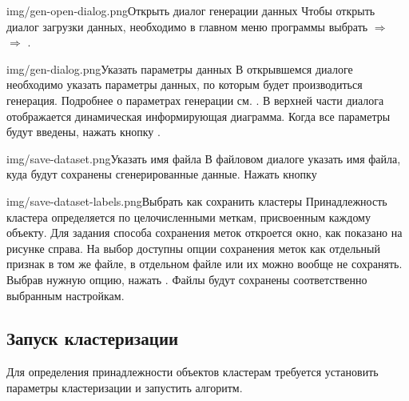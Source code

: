 \documentclass[12pt,tikz]{instruction}
\begin{document}
\begin{steps}
	\begin{ist}{img/gen-open-dialog.png}{Открыть диалог генерации данных}
		Чтобы открыть диалог загрузки данных, необходимо в главном меню программы выбрать  $\Rightarrow$  $\Rightarrow$ .
	\end{ist}
	\begin{ist}{img/gen-dialog.png}{Указать параметры данных}
		В открывшемся диалоге необходимо указать параметры данных, по которым будет производиться генерация. Подробнее о параметрах генерации см. \cite{kovaleva}. В верхней части диалога отображается динамическая информирующая диаграмма. Когда все параметры будут введены, нажать кнопку . \vspace{1.2cm}
	\end{ist}
	\begin{ist}{img/save-dataset.png}{Указать имя файла}
		В файловом диалоге указать имя файла, куда будут сохранены сгенерированные данные. Нажать кнопку  
	\end{ist}
	\begin{ist}{img/save-dataset-labels.png}{Выбрать как сохранить кластеры}
		Принадлежность кластера определяется по целочисленными меткам, присвоенным каждому объекту. Для задания способа сохранения меток откроется окно, как показано на рисунке справа. На выбор доступны опции сохранения меток как отдельный признак в том же файле, в отдельном файле или их можно вообще не сохранять. Выбрав нужную опцию, нажать . Файлы будут сохранены соответственно выбранным настройкам.
	\end{ist}
\end{steps}

\newpage
\subsection{Запуск кластеризации}

Для определения принадлежности объектов кластерам требуется установить параметры кластеризации и запустить алгоритм.
\end{document}
